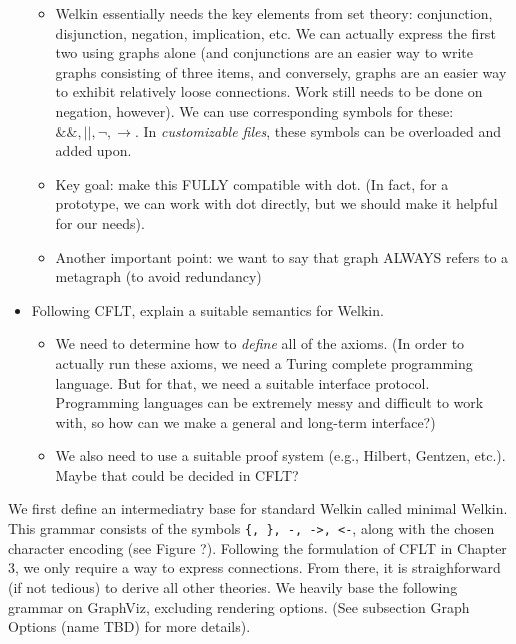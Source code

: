 \begin{itemize}
\begin{itemize}
			            \item Welkin essentially needs the key elements from set theory: conjunction, disjunction, negation, implication, etc. We can actually express the first two using graphs alone (and conjunctions are an easier way to write graphs consisting of three items, and conversely, graphs are an easier way to exhibit relatively loose connections. Work still needs to be done on negation, however). We can use corresponding symbols for these: $\&\&, ||, \neg, \rightarrow$. In \textit{customizable files}, these symbols can be overloaded and added upon.
			            \item Key goal: make this FULLY compatible with dot. (In fact, for a prototype, we can work with dot directly, but we should make it helpful for our needs).
									\item Another important point: we want to say that graph ALWAYS refers to a metagraph (to avoid redundancy)		            \end{itemize}
	\item Following CFLT, explain a suitable semantics for Welkin.
	      \begin{itemize}
		      \item We need to determine how to \textit{define} all of the axioms. (In order to actually run these axioms, we need a Turing complete programming language. But for that, we need a suitable interface protocol. Programming languages can be extremely messy and difficult to work with, so how can we make a general and long-term interface?)
		      \item We also need to use a suitable proof system (e.g., Hilbert, Gentzen, etc.). Maybe that could be decided in CFLT?
	      \end{itemize}
\end{itemize}

We first define an intermediatry base for standard Welkin called minimal Welkin. This grammar consists of the symbols \texttt{\{, \}, -, ->, <-}, along with the chosen character encoding (see Figure ?). Following the formulation of CFLT in Chapter 3, we only require a way to express connections. From there, it is straighforward (if not tedious) to derive all other theories. We heavily base the following grammar on GraphViz, excluding rendering options. (See subsection Graph Options (name TBD) for more details).

